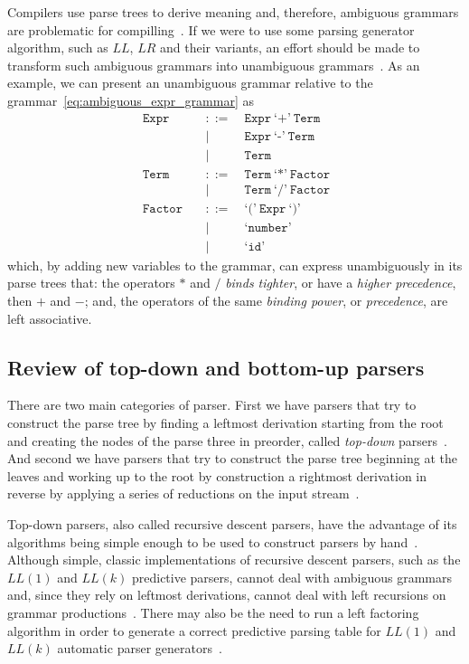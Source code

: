 \documentclass[
  oneside,
  english,
  coorientadorbanca,
  embeddedlogo,
  noabntexcite
]{ufsc-thesis-rn46-2019}
\newcommand{\bnfvar}[1]{\ \bnfvars{#1}}
\newcommand{\bnfvars}[1]{\texttt{#1}}
\newcommand{\bnfter}[1]{\ \bnfters{#1}}
\newcommand{\bnfters}[1]{\textrm{`}\texttt{#1}\textrm{'}}
\newcommand{\bnfprod}[2]{\bnfvars{#1} &\ &::= & #2}
\newcommand{\bnfmore}[1]{ && \mid{} & #1}
\begin{document}
Compilers use parse trees to derive meaning and, therefore, ambiguous grammars are problematic for compilling~\cite{appel2003modern}.
If we were to use some parsing generator algorithm, such as $LL$, $LR$ and their variants, an effort should be made to transform such ambiguous grammars into unambiguous grammars~\cite{appel2003modern}.
As an example, we can present an unambiguous grammar relative to the grammar~\eqref{eq:ambiguous_expr_grammar} as
\begin{equation}~\label{eq:unambiguous_expr_grammar}
  \begin{alignedat}{2}
    \bnfprod{Expr}{\bnfvar{Expr} \bnfter{+} \bnfvar{Term}} \\
    \bnfmore{\bnfvar{Expr}\bnfter{-}\bnfvar{Term}} \\
    \bnfmore{\bnfvar{Term}} \\
    \bnfprod{Term}{\bnfvar{Term} \bnfter{*} \bnfvar{Factor}} \\
    \bnfmore{\bnfvar{Term}\bnfter{/}\bnfvar{Factor}} \\
    \bnfprod{Factor}{\bnfter{(}\bnfvar{Expr}\bnfter{)}} \\
    \bnfmore{\bnfter{number}} \\
    \bnfmore{\bnfter{id}}
  \end{alignedat}
\end{equation}
which, by adding new variables to the grammar, can express unambiguously in its parse trees that: the operators $*$ and $/$ \textit{binds tighter}, or have a \textit{higher precedence}, then $+$ and $-$; and, the operators of the same \textit{binding power}, or \textit{precedence}, are left associative.

\subsection{Review of top-down and bottom-up parsers}
There are two main categories of parser.
First we have parsers that try to construct the parse tree by finding a leftmost derivation starting from the root and creating the nodes of the parse three in preorder, called \textit{top-down} parsers~\cite{Aho:2006:CPT:1177220}.
And second we have parsers that try to construct the parse tree beginning at the leaves and working up to the root by construction a rightmost derivation in reverse by applying a series of reductions on the input stream~\cite{Aho:2006:CPT:1177220}.

Top-down parsers, also called recursive descent parsers, have the advantage of its algorithms being simple enough to be used to construct parsers by hand~\cite{appel2003modern}.
Although simple, classic implementations of recursive descent parsers, such as the $LL(1)$ and $LL(k)$ predictive parsers, cannot deal with ambiguous grammars and, since they rely on leftmost derivations, cannot deal with left recursions on grammar productions~\cite{Aho:2006:CPT:1177220}.
There may also be the need to run a left factoring algorithm in order to generate a correct predictive parsing table for $LL(1)$ and $LL(k)$ automatic parser generators~\cite{Aho:2006:CPT:1177220}.
\end{document}
